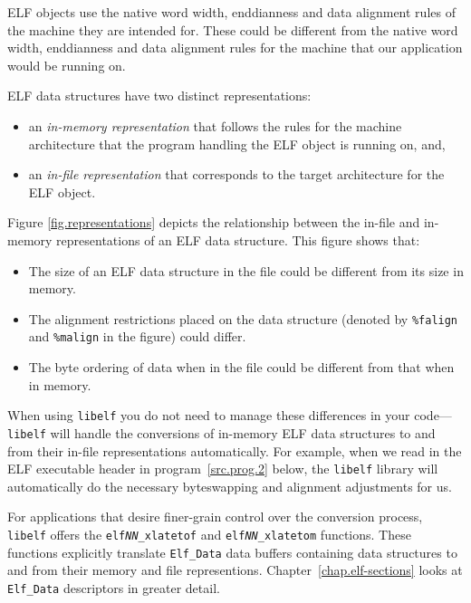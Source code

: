 \documentclass[a4paper,pdftex]{book}
\newcommand{\function}[1]{\texttt{#1}}
\newcommand{\library}[1]{\texttt{#1}}
\newcommand{\parameter}[1]{\texttt{#1}}
\newcommand{\type}[1]{\texttt{#1}}
\begin{document}
ELF objects use the native word width, enddianness and data alignment
rules of the machine they are intended for.  These could be different
from the native word width, enddianness and data alignment rules for
the machine that our application would be running on.

ELF data structures have two distinct
representations:
\begin{itemize}
\item an \emph{in-memory representation} that follows the rules for
  the machine architecture that the program handling the ELF object is
  running on, and,
\item an \emph{in-file representation} that corresponds to the target
  architecture for the ELF object.
\end{itemize}

Figure \vref{fig.representations} depicts the relationship between the
in-file and in-memory representations of an ELF data structure.  This
figure shows that:

\begin{itemize}
\item The size of an ELF data structure in the file could be different
  from its size in memory.
\item The alignment restrictions placed on the data structure (denoted
  by \parameter{\%falign} and \parameter{\%malign} in the figure)
  could differ.
\item The byte ordering of data when in the file could be different
  from that when in memory.
\end{itemize}

When using \library{libelf} you do not need to manage these
differences in your code---\library{libelf} will handle the
conversions of in-memory ELF data structures to and from their in-file
representations automatically.  For example, when we read in the ELF
executable header in program~\vref{src.prog.2} below, the
\library{libelf} library will automatically do the necessary
byteswapping and alignment adjustments for
us.\index{libelf@\library{libelf}!automatic data
  conversion}

For applications that desire finer-grain control over the conversion
process, \library{libelf} offers the
\function{elf\textit{NN}\_xlatetof} and
\function{elf\textit{NN}\_xlatetom} functions.  These functions
explicitly translate \type{Elf\_Data} data buffers containing data
structures to and from their memory and file
representions.
Chapter~\vref{chap.elf-sections} looks at \type{Elf\_Data} descriptors
in greater detail.
\end{document}
